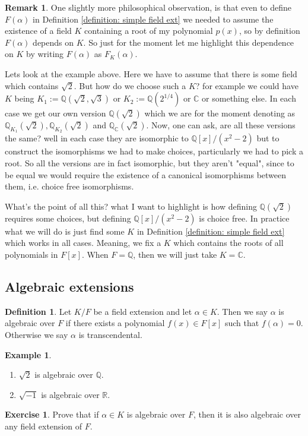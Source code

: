 \documentclass[11pt,a4paper]{report}
\theoremstyle{plain}
\theoremstyle{definition}
\newtheorem{definition}[subsection]{Definition}
\newtheorem{exmp}[subsection]{Example}
\theoremstyle{definition}
\newtheorem{rmrk}[subsection]{Remark}
\newtheorem{question}[subsection]{Exercise}
\newcommand{\Q}{\mathbb{Q}}
\newcommand{\RR}{\mathbb{R}}
\def\CC{\mathbb{C}}
\def\QQ{\mathbb{Q}}
\def \a{\alpha}
\begin{document}
	\begin{rmrk}
		One slightly more philosophical observation, is that even to define $F(\a)$ in Definition \ref{definition: simple field ext} we needed to assume the existence of a field $K$ containing a root of my polynomial $p(x)$, so by definition $F(\a)$ depends on $K$. So just for the moment let me highlight this dependence on $K$ by writing $F(\a)$ as $F_{K}(\a)$.
		
		Lets look at the example above. Here we have to assume that there is some field which contains $\sqrt{2}$. But how do we choose such a $K$? for example we could have $K$ being $K_1:=\Q(\sqrt{2},\sqrt{3})$ or $K_2:=\QQ(2^{1/4})$ or $\CC$ or something else. In each case we get our own version $\QQ(\sqrt{2})$ which we are for the moment denoting as $\QQ_{K_1}(\sqrt{2}),\QQ_{K_2}(\sqrt{2})$ and $\QQ_{\CC}(\sqrt{2})$. Now, one can ask, are all these versions the same? well in each case they are isomorphic to $\QQ[x]/(x^2-2)$ but to construct the isomorphisms we had to make choices, particularly we had to pick a root. So all the versions are in fact isomorphic, but they aren't "equal", since to be equal we would require the existence of a canonical isomorphisms between them, i.e.  choice free isomorphisms.
		
		What's the point of all this? what I want to highlight is how defining $\QQ(\sqrt{2})$ requires some choices, but defining $\QQ[x]/(x^2-2)$ is choice free.  In practice what we will do is just find some $K$ in Definition \ref{definition: simple field ext} which works in all cases. Meaning, we fix a $K$ which contains the roots of all polynomials in $F[x]$. When $F=\QQ$, then we will just take $K=\CC$. 
		
		
		
	\end{rmrk}
	
	
	\subsection{Algebraic extensions}
	
	\begin{definition}\label{definition: alg elts}
		Let $K/F$ be a field extension and let $\a \in K$. Then we say $\a$ is algebraic over $F$ if there exists a polynomial $f(x) \in F[x]$ such that $f(\a)=0$. Otherwise we say $\a$ is transcendental. 		
	\end{definition}
	
	\begin{exmp}
		\begin{enumerate}
			\item $\sqrt{2}$ is algebraic over $\QQ$.
			\item $\sqrt{-1}$ is algebraic over $\RR$.
		\end{enumerate}
	\end{exmp}
	\begin{question}
		Prove that if $\a \in K$ is algebraic over $F$, then it is also algebraic over any field extension of $F$. 
	\end{question}
	
\end{document}
